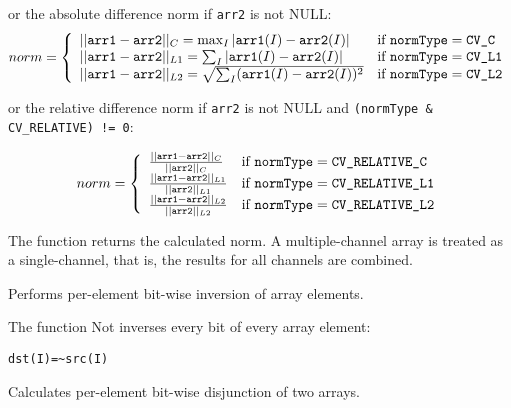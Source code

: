 or the absolute difference norm if \texttt{arr2} is not NULL:
\[
norm = \left\{ \begin{array}{l l} ||\texttt{arr1}-\texttt{arr2}||_C    = \max_I |\texttt{arr1}(I) - \texttt{arr2}(I)| & \mbox{if $\texttt{normType} = \texttt{CV\_C}$}\\ ||\texttt{arr1}-\texttt{arr2}||_{L1} = \sum_I |\texttt{arr1}(I) - \texttt{arr2}(I)| & \mbox{if $\texttt{normType} = \texttt{CV\_L1}$}\\ ||\texttt{arr1}-\texttt{arr2}||_{L2} = \sqrt{\sum_I (\texttt{arr1}(I) - \texttt{arr2}(I))^2} & \mbox{if $\texttt{normType} = \texttt{CV\_L2}$}\\ \end{array} \right.
\]

or the relative difference norm if \texttt{arr2} is not NULL and \texttt{(normType \& CV\_RELATIVE) != 0}:

\[
norm = \left\{ \begin{array}{l l} \frac{||\texttt{arr1}-\texttt{arr2}||_C    }{||\texttt{arr2}||_C   } & \mbox{if $\texttt{normType} = \texttt{CV\_RELATIVE\_C}$}\\ \frac{||\texttt{arr1}-\texttt{arr2}||_{L1} }{||\texttt{arr2}||_{L1}} & \mbox{if $\texttt{normType} = \texttt{CV\_RELATIVE\_L1}$}\\ \frac{||\texttt{arr1}-\texttt{arr2}||_{L2} }{||\texttt{arr2}||_{L2}} & \mbox{if $\texttt{normType} = \texttt{CV\_RELATIVE\_L2}$}\\ \end{array} \right.
\]

The function returns the calculated norm. A multiple-channel array is treated as a single-channel, that is, the results for all channels are combined.

Performs per-element bit-wise inversion of array elements.


\begin{description}
\end{description}


The function Not inverses every bit of every array element:

\begin{lstlisting}
dst(I)=~src(I)
\end{lstlisting}


Calculates per-element bit-wise disjunction of two arrays.


\begin{description}
\end{description}



